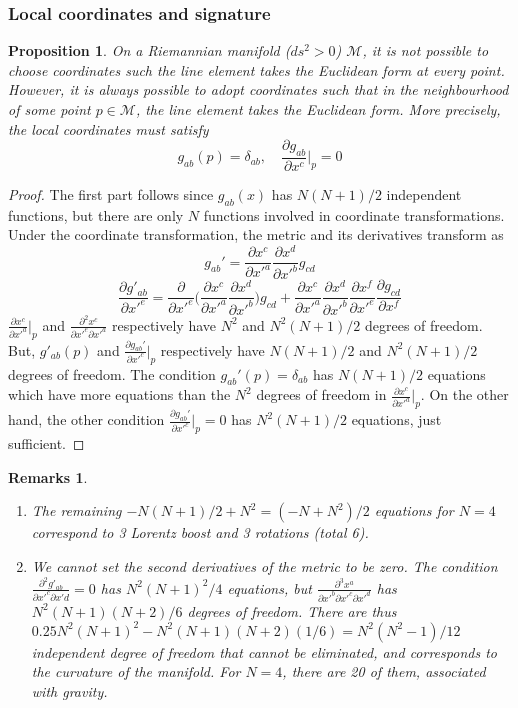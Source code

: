 \documentclass[a4paper]{article}
\newtheorem{remarks}{Remarks}[section]
\theoremstyle{new}
\newtheorem{prop}{Proposition}[section]
\begin{document}
\subsubsection{Local coordinates and signature}
\begin{prop}
On a Riemannian manifold ($ds^2>0$) $\mathcal{M}$, it is not possible to choose coordinates such the line element takes the Euclidean form at every point. However, it is always possible to adopt coordinates such that in the neighbourhood of some point $p\in\mathcal{M}$, the line element takes the Euclidean form. More precisely, the local coordinates must satisfy
$$g_{ab}(p)=\delta_{ab},\quad\frac{\partial g_{ab}}{\partial x^c}\bigg|_p=0$$
\end{prop}
\begin{proof}
The first part follows since $g_{ab}(x)$ has $N(N + 1)/2$ independent functions, but there are only $N$ functions involved in coordinate transformations. Under the coordinate transformation, the metric and its derivatives transform as
$$g_{ab}'=\frac{\partial x^c}{\partial x'^a}\frac{\partial x^d}{\partial x'^b}g_{cd}$$
$$\frac{\partial g'_{ab}}{\partial x'^e}=\frac{\partial}{\partial x'^e}\bigg(\frac{\partial x^c}{\partial x'^a}\frac{\partial x^d}{\partial x'^b}\bigg)g_{cd}+\frac{\partial x^c}{\partial x'^a}\frac{\partial x^d}{\partial x'^b}\frac{\partial x^f}{\partial x'^e}\frac{\partial g_{cd}}{\partial x^f}$$
$\frac{\partial x^c}{\partial x'^a}|_p$ and $\frac{\partial^2x^c}{\partial x'^e\partial x'^a}$ respectively have $N^2$ and $N^2(N+1)/2$ degrees of freedom. But, $g'_{ab}(p)$ and $\frac{\partial g_{ab}'}{\partial x'^c}|_p$ respectively have $N(N+1)/2$ and $N^2(N+1)/2$ degrees of freedom. The condition $g_{ab}'(p)=\delta_{ab}$ has $N(N+1)/2$ equations which have more equations than the $N^2$ degrees of freedom in $\frac{\partial x^c}{\partial x'^a}|_p$. On the other hand, the other condition $\frac{\partial g_{ab}'}{\partial x'^c}|_p=0$ has $N^2(N+1)/2$ equations, just sufficient.
\end{proof}
\begin{remarks}\leavevmode
\begin{enumerate}
    \item The remaining $-N(N+1)/2+N^2=(-N+N^2)/2$ equations for $N=4$ correspond to 3 Lorentz boost and 3 rotations (total 6).
    \item We cannot set the second derivatives of the metric to be zero. The condition $\frac{\partial^2g'_{ab}}{\partial x'^c\partial x'd}=0$ has $N^2(N+1)^2/4$ equations, but $\frac{\partial^3x^a}{\partial x'^b\partial x'^c\partial x'^d}$ has $N^2(N+1)(N+2)/6$ degrees of freedom. There are thus $0.25N^2(N+1)^2-N^2(N+1)(N+2)(1/6)=N^2(N^2-1)/12$ independent degree of freedom that cannot be eliminated, and corresponds to the curvature of the manifold. For $N=4$, there are 20 of them, associated with gravity.
\end{enumerate}
\end{remarks}
\end{document}
